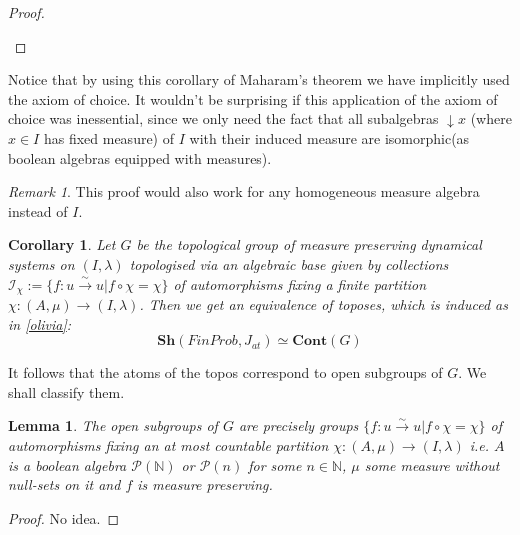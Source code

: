 \documentclass[a4paper,draft]{amsproc}
\theoremstyle{plain}
\newtheorem{lemma}{Lemma}[section]
\newtheorem{corollary}{Corollary}[section]
\theoremstyle{definition}
\theoremstyle{remark}
\newtheorem{remark}{Remark}[section]
\numberwithin{equation}{section}
\begin{document}
\begin{proof}
\begin{enumerate}
\end{enumerate}
\end{proof}

Notice that by using this corollary of Maharam's theorem we have implicitly used the axiom of choice. It wouldn't be surprising if this application of the axiom of choice was inessential, since we only need the fact that all subalgebras $\downarrow x$ (where $x \in I$ has fixed measure) of $I$ with their induced measure are isomorphic(as boolean algebras equipped with measures).

\begin{remark}
This proof would also work for any homogeneous measure algebra instead of $I$.
\end{remark}
\begin{corollary} Let $G$ be the topological group of measure preserving dynamical systems on $(I,\lambda)$ topologised via an algebraic base given by collections $\mathcal{I}_{\chi}:=\{f:u\overset{\sim}{\rightarrow} u| f\circ \chi=\chi\} $ of automorphisms fixing a finite partition $\chi: (A,\mu)\rightarrow (I,\lambda)$. Then we get an equivalence of toposes, which is induced as in \ref{olivia}:
\[\textbf{Sh}(FinProb, J_{at})\simeq \textbf{Cont}(G)\]
\end{corollary}
It follows that the atoms of the topos correspond to open subgroups of $G$. We shall classify them. %
\begin{lemma} The open subgroups of $G$ are precisely groups $\{f:u\overset{\sim}{\rightarrow} u| f\circ \chi=\chi\} $ of automorphisms fixing an at most countable partition $\chi: (A,\mu)\rightarrow (I,\lambda)$ i.e. $A$ is a boolean algebra $\mathcal{P}(\mathbb{N})$ or $\mathcal{P}(n)$ for some $n\in\mathbb{N}$, $\mu$ some measure without null-sets on it and $f$ is measure preserving.
\end{lemma}
\begin{proof} No idea.
\end{proof}
\end{document}
